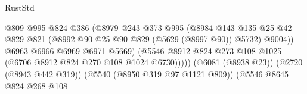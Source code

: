 \begin{lexlean}{RustStd}
\begin{coremodule}
                                                    @809
                                                    @995
                                                    @824
                                                    @386
                                                    (@8979
                                                      @243
                                                      @373
                                                      @995
                                                      (@8984
                                                        @143
                                                        @135
                                                        @25
                                                        @42
                                                        @829
                                                        @821
                                                        (@8992
                                                          @90
                                                          @25
                                                          @90
                                                          @829
                                                          (@5629 (@8997 @90))
                                                          @5732)
                                                        @9004))
                                                    @6963
                                                    @6966
                                                    @6969
                                                    @6971
                                                    @5669)
                                                  (@5546
                                                    @8912
                                                    @824
                                                    @273
                                                    @108
                                                    @1025
                                                    (@6706 @8912 @824 @270 @108 @1024 @6730)))))
                                            (@6081 (@8938 @23))
                                            (@2720 (@8943 @442 @319))
                                            (@5540 (@8950 @319 @97 @1121 @809))
                                            (@5546
                                              @8645
                                              @824
                                              @268
                                              @108

\end{coremodule}
\end{lexlean}
